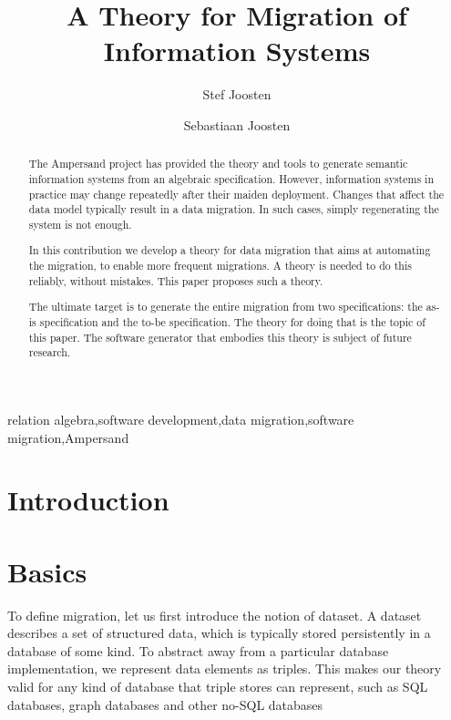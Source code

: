\documentclass{elsarticle}
\begin{document}


\title{A Theory for Migration of Information Systems}
\author[ou,ordina]{Stef Joosten}
\author[umn]{Sebastiaan Joosten}
\address[ou]{Open Universiteit Nederland, Heerlen, the Netherlands}
\address[ordina]{Ordina NV, Nieuwegein, the Netherlands}
\address[umn]{University of Minnesota, Minneapolis, USA}

\begin{abstract}
	The Ampersand project has provided the theory and tools to generate semantic information systems from an algebraic specification.
	However, information systems in practice may change repeatedly after their maiden deployment.
	Changes that affect the data model typically result in a data migration.
	In such cases, simply regenerating the system is not enough.

	In this contribution we develop a theory for data migration that aims at automating the migration,
	to enable more frequent migrations.
	A theory is needed to do this reliably, without mistakes.
	This paper proposes such a theory.

	The ultimate target is to generate the entire migration from two specifications: the as-is specification and the to-be specification.
	The theory for doing that is the topic of this paper.
	The software generator that embodies this theory is subject of future research.
\end{abstract}

\begin{keyword}
relation algebra\sep software development\sep data migration\sep software migration\sep Ampersand
\end{keyword}
\maketitle

\section{Introduction}
\label{sct:Introduction}

\section{Basics}
\label{sct:Basics}
	To define migration, let us first introduce the notion of dataset.
	A dataset describes a set of structured data, which is typically stored persistently in a database of some kind.
	To abstract away from a particular database implementation,
	we represent data elements as triples.
	This makes our theory valid for any kind of database that triple stores can represent,
	such as SQL databases, graph databases and other no-SQL databases
\end{document}
